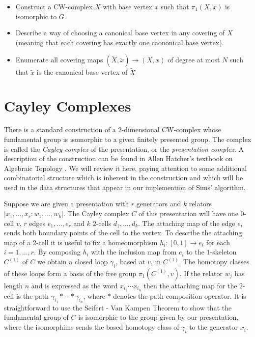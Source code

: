 \documentclass[12pt]{article}
\theoremstyle{definition}
\renewcommand{\tilde}{\widetilde}
\begin{document}
  \begin{itemize}
  \item Construct a CW-complex $X$ with base vertex $x$ such that
    $\pi_1(X, x)$ is isomorphic to $G$.
   \item Describe a way of choosing a canonical base vertex in any
     covering of $X$ (meaning that each covering has exactly one caononical base vertex).
   \item Enumerate all covering maps $(\tilde X, \tilde x)\to (X,
     x)$ of degree at most $N$ such that $\tilde x$ is the canonical base
     vertex of $\tilde X$
   \end{itemize}

   \section{Cayley Complexes}

   There is a standard construction of a $2$-dimensional CW-complex whose
   fundamental group is isomorphic to a given finitely presented group.  The
   complex is called the {\it Cayley complex} of the presentation, or the {\it
     presentation complex}.  A description of the construction can be found in
   Allen Hatcher's textbook on Algebraic Topology \cite[Section 1.3]{Hatcher}.
   We will review it here, paying attention to some additional combinatorial
   structure which is inherent in the construction and which will be used in the
   data structures that appear in our implemention of Sims' algorithm.

   Suppose we are given a presentation with $r$ generators and $k$ relators
   $|x_1, \ldots, x_r : w_1, \ldots, w_k|$.  The Cayley complex $C$ of this
   presentation will have one $0$-cell $v$, $r$ edges $e_1, \ldots, e_r$ and
   $k$ $2$-cells $d_1, \ldots, d_k$. The attaching map of the edge $e_i$
   sends both boundary points of the cell to the vertex.  To describe the
   attaching map of a $2$-cell it is useful to fix a homeomorphism
   $h_i : [0,1] \to e_i$ for each $i = 1, \ldots, r$.  By composing $h_i$ with
   the inclusion map from $e_i$ to the $1$-skeleton $C^{(1)}$ of $C$ we obtain a
   closed loop $\gamma_i$, based at $v$, in $C^{(1)}$.  The homotopy classes of
   these loops form a basis of the free group $\pi_1(C^{(1)}, v)$.  If the
   relator $w_j$ has length $n$ and is expressed as the word
   $x_{i_1}\cdots x_{i_n}$ then the attaching map for the $2$-cell is the path
   $\gamma_{i_1}\ast\cdots\ast\gamma_{i_n}$, where $\ast$ denotes the path
   composition operator.  It is straightforward \cite[Corollary 1.28]{Hatcher}
   to use the Seifert - Van Kampen Theorem to show that the fundamental group of
   $C$ is isomorphic to the group given by our presentation, where the
   isomorphims sends the based homotopy class of $\gamma_i$ to the generator $x_i$.
\end{document}
